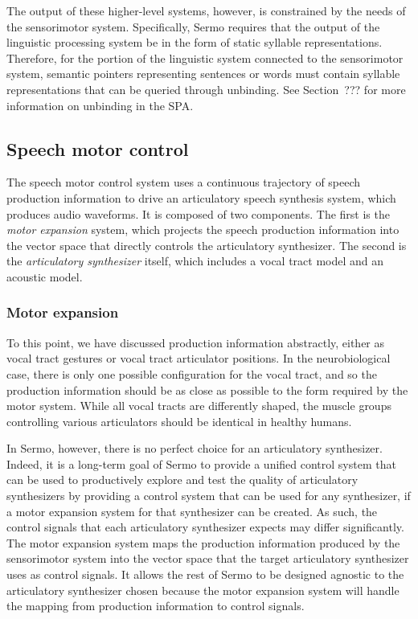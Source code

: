 The output of these higher-level systems,
however, is constrained by the needs
of the sensorimotor system.
Specifically, Sermo requires that
the output of the
linguistic processing system
be in the form of static syllable representations.
Therefore, for the portion
of the linguistic system connected
to the sensorimotor system,
semantic pointers representing
sentences or words must contain
syllable representations that can be
queried through unbinding.
See Section~??? for more information
on unbinding in the SPA.

\subsection{Speech motor control}
\label{sec:model-motorcontrol}

The speech motor control system
uses a continuous trajectory
of speech production information
to drive an articulatory
speech synthesis system,
which produces audio waveforms.
It is composed of two components.
The first is the \textit{motor expansion} system,
which projects the speech production information
into the vector space that
directly controls the articulatory synthesizer.
The second is
the \textit{articulatory synthesizer} itself,
which includes a vocal tract model
and an acoustic model.

\subsubsection{Motor expansion}

To this point, we have discussed
production information abstractly,
either as vocal tract gestures
or vocal tract articulator positions.
In the neurobiological case,
there is only one possible
configuration for the vocal tract,
and so the production information
should be as close as possible to the
form required by the motor system.
While all vocal tracts are differently shaped,
the muscle groups controlling various articulators
should be identical in healthy humans.

In Sermo, however,
there is no perfect choice
for an articulatory synthesizer.
Indeed, it is a long-term goal of Sermo
to provide a unified control system
that can be used to productively
explore and test the quality
of articulatory synthesizers
by providing a control system
that can be used for any synthesizer,
if a motor expansion system
for that synthesizer can be created.
As such, the control signals
that each articulatory synthesizer
expects may differ significantly.
The motor expansion system
maps the production information
produced by the sensorimotor system
into the vector space that
the target articulatory synthesizer
uses as control signals.
It allows the rest of Sermo
to be designed agnostic
to the articulatory synthesizer chosen
because the motor expansion system
will handle the mapping
from production information
to control signals.

